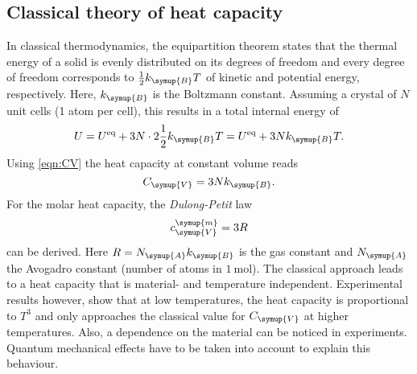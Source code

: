 \subsection{Classical theory of heat capacity}
\label{subsec:Classical}

In classical thermodynamics, the equipartition theorem states that the thermal energy of a solid is evenly distributed on its degrees of freedom and every degree of
freedom corresponds to $\frac{1}{2}k_{\symup{B}} T$ of kinetic and potential energy, respectively. Here, $k_{\symup{B}} $ is the Boltzmann constant.
Assuming a crystal of $N$ unit cells (1 atom per cell), this results in a total internal energy of
\begin{equation*}
    U = U^\text{eq} + 3N \cdot 2 \frac{1}{2}k_{\symup{B}}  T = U^\text{eq} + 3Nk_{\symup{B}}  T.
\end{equation*}
Using \autoref{eqn:CV} the heat capacity at constant volume reads
\begin{equation*}
    C_{\symup{V}} = 3Nk_{\symup{B}} .
\end{equation*}
For the molar heat capacity, the \textit{Dulong-Petit} law
\begin{equation}
    c^{\symup{m}}_{\symup{V}} = 3 R
\end{equation}
can be derived. Here $R = N_{\symup{A}} k_{\symup{B}}$ is the gas constant and $N_{\symup{A}}$ the Avogadro constant (number of atoms in $\qty{1}{\mol}$).
The classical approach leads to a heat capacity that is material- and temperature independent. Experimental results however, show that at low temperatures, the heat capacity is
proportional to $T^3$ and only approaches the classical value for $C_{\symup{V}}$ at higher temperatures. Also, a dependence on the material can be noticed in experiments.
Quantum mechanical effects have to be taken into account to explain this behaviour.

